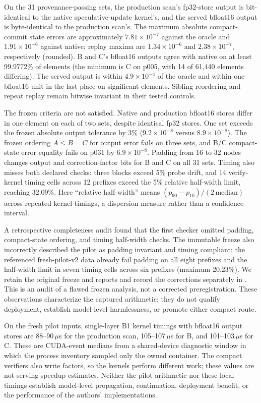 \documentclass[conference]{IEEEtran}
\begin{document}
On the 31 provenance-passing sets, the production scan's fp32-store output is bit-identical to the native speculative-update kernel's, and the served bfloat16 output is byte-identical to the production scan's. The maximum absolute compact-commit state errors are approximately $7.81\times10^{-7}$ against the oracle and $1.91\times10^{-6}$ against native; replay maxima are $1.34\times10^{-6}$ and $2.38\times10^{-7}$, respectively (rounded). B and C's bfloat16 outputs agree with native on at least 99.9772\% of elements (the minimum is C on p005, with 14 of 61,440 elements differing). The served output is within $4.9\times10^{-4}$ of the oracle and within one bfloat16 unit in the last place on significant elements. Sibling reordering and repeat replay remain bitwise invariant in their tested controls.

The frozen criteria are not satisfied. Native and production bfloat16 stores differ in one element on each of two sets, despite identical fp32 stores. One set exceeds the frozen absolute output tolerance by 3\% ($9.2\times10^{-8}$ versus $8.9\times10^{-8}$). The frozen ordering $A\le B=C$ for output error fails on three sets, and B/C compact-state error equality fails on p031 by $6.9\times10^{-8}$. Padding from 16 to 32 nodes changes output and correction-factor bits for B and C on all 31 sets. Timing also misses both declared checks: three blocks exceed 5\% probe drift, and 14 verify-kernel timing cells across 12 prefixes exceed the 5\% relative half-width limit, reaching 32.09\%. Here ``relative half-width'' means $(p_{90}-p_{10})/(2\,\mathrm{median})$ across repeated kernel timings, a dispersion measure rather than a confidence interval.

A retrospective completeness audit found that the first checker omitted padding, compact-state ordering, and timing half-width checks. The immutable freeze also incorrectly described the pilot as padding invariant and timing compliant: the referenced fresh-pilot-v2 data already fail padding on all eight prefixes and the half-width limit in seven timing cells across six prefixes (maximum 20.23\%). We retain the original freeze and reports and record the corrections separately in . This is an audit of a flawed frozen analysis, not a corrected preregistration. These observations characterize the captured arithmetic; they do not qualify deployment, establish model-level harmlessness, or promote either compact route.

On the fresh pilot inputs, single-layer B1 kernel timings with bfloat16 output stores are 88--90\,$\mu$s for the production scan, 105--107\,$\mu$s for B, and 101--103\,$\mu$s for C. These are CUDA-event medians from a shared-device diagnostic window in which the process inventory sampled only the owned container. The compact verifiers also write factors, so the kernels perform different work; these values are not serving-speedup estimates. Neither the pilot arithmetic nor these local timings establish model-level propagation, continuation, deployment benefit, or the performance of the authors' implementations.
\end{document}
